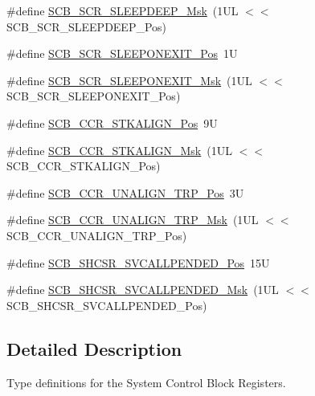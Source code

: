 \begin{DoxyCompactItemize}
\item 
\#define \mbox{\hyperlink{group___c_m_s_i_s___s_c_b_ga77c06a69c63f4b3f6ec1032e911e18e7}{S\+C\+B\+\_\+\+S\+C\+R\+\_\+\+S\+L\+E\+E\+P\+D\+E\+E\+P\+\_\+\+Msk}}~(1\+U\+L $<$$<$ S\+C\+B\+\_\+\+S\+C\+R\+\_\+\+S\+L\+E\+E\+P\+D\+E\+E\+P\+\_\+\+Pos)
\item 
\#define \mbox{\hyperlink{group___c_m_s_i_s___s_c_b_ga3680a15114d7fdc1e25043b881308fe9}{S\+C\+B\+\_\+\+S\+C\+R\+\_\+\+S\+L\+E\+E\+P\+O\+N\+E\+X\+I\+T\+\_\+\+Pos}}~1U
\item 
\#define \mbox{\hyperlink{group___c_m_s_i_s___s_c_b_ga50a243e317b9a70781b02758d45b05ee}{S\+C\+B\+\_\+\+S\+C\+R\+\_\+\+S\+L\+E\+E\+P\+O\+N\+E\+X\+I\+T\+\_\+\+Msk}}~(1\+U\+L $<$$<$ S\+C\+B\+\_\+\+S\+C\+R\+\_\+\+S\+L\+E\+E\+P\+O\+N\+E\+X\+I\+T\+\_\+\+Pos)
\item 
\#define \mbox{\hyperlink{group___c_m_s_i_s___s_c_b_gac2d20a250960a432cc74da59d20e2f86}{S\+C\+B\+\_\+\+C\+C\+R\+\_\+\+S\+T\+K\+A\+L\+I\+G\+N\+\_\+\+Pos}}~9U
\item 
\#define \mbox{\hyperlink{group___c_m_s_i_s___s_c_b_ga33cf22d3d46af158a03aad25ddea1bcb}{S\+C\+B\+\_\+\+C\+C\+R\+\_\+\+S\+T\+K\+A\+L\+I\+G\+N\+\_\+\+Msk}}~(1\+U\+L $<$$<$ S\+C\+B\+\_\+\+C\+C\+R\+\_\+\+S\+T\+K\+A\+L\+I\+G\+N\+\_\+\+Pos)
\item 
\#define \mbox{\hyperlink{group___c_m_s_i_s___s_c_b_gac4e4928b864ea10fc24dbbc57d976229}{S\+C\+B\+\_\+\+C\+C\+R\+\_\+\+U\+N\+A\+L\+I\+G\+N\+\_\+\+T\+R\+P\+\_\+\+Pos}}~3U
\item 
\#define \mbox{\hyperlink{group___c_m_s_i_s___s_c_b_ga68c96ad594af70c007923979085c99e0}{S\+C\+B\+\_\+\+C\+C\+R\+\_\+\+U\+N\+A\+L\+I\+G\+N\+\_\+\+T\+R\+P\+\_\+\+Msk}}~(1\+U\+L $<$$<$ S\+C\+B\+\_\+\+C\+C\+R\+\_\+\+U\+N\+A\+L\+I\+G\+N\+\_\+\+T\+R\+P\+\_\+\+Pos)
\item 
\#define \mbox{\hyperlink{group___c_m_s_i_s___s_c_b_ga2f93ec9b243f94cdd3e94b8f0bf43641}{S\+C\+B\+\_\+\+S\+H\+C\+S\+R\+\_\+\+S\+V\+C\+A\+L\+L\+P\+E\+N\+D\+E\+D\+\_\+\+Pos}}~15U
\item 
\#define \mbox{\hyperlink{group___c_m_s_i_s___s_c_b_ga6095a7acfbad66f52822b1392be88652}{S\+C\+B\+\_\+\+S\+H\+C\+S\+R\+\_\+\+S\+V\+C\+A\+L\+L\+P\+E\+N\+D\+E\+D\+\_\+\+Msk}}~(1\+U\+L $<$$<$ S\+C\+B\+\_\+\+S\+H\+C\+S\+R\+\_\+\+S\+V\+C\+A\+L\+L\+P\+E\+N\+D\+E\+D\+\_\+\+Pos)
\end{DoxyCompactItemize}


\subsection{Detailed Description}
Type definitions for the System Control Block Registers. 



